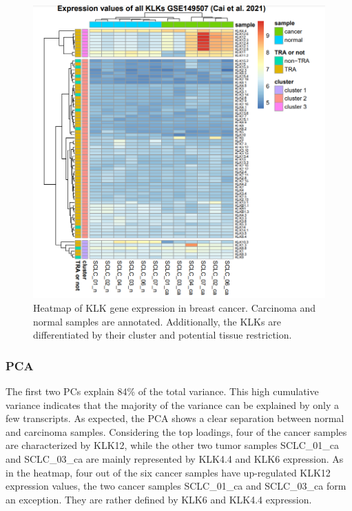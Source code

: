 \documentclass[
]{article}
\begin{document}
\begin{figure}

{\centering \includegraphics[width=0.5\linewidth]{images/Heatmap_lung} 

}

\caption{Heatmap of KLK gene expression in breast cancer. Carcinoma and normal samples are annotated. Additionally, the KLKs are differentiated by their cluster and potential tissue restriction.}\label{fig:Heatmap - lung }
\end{figure}

\hypertarget{pca}{%
\subsubsection{PCA}\label{pca}}

The first two PCs explain 84\% of the total variance. This high
cumulative variance indicates that the majority of the variance can be
explained by only a few transcripts. As expected, the PCA shows a clear
separation between normal and carcinoma samples. Considering the top
loadings, four of the cancer samples are characterized by KLK12, while
the other two tumor samples SCLC\_01\_ca and SCLC\_03\_ca are mainly
represented by KLK4.4 and KLK6 expression. As in the heatmap, four out
of the six cancer samples have up-regulated KLK12 expression values, the
two cancer samples SCLC\_01\_ca and SCLC\_03\_ca form an exception. They
are rather defined by KLK6 and KLK4.4 expression.
\end{document}

